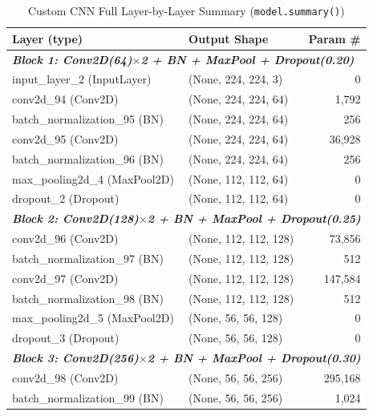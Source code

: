 \documentclass[12pt,a4paper]{article}
\begin{document}
\begin{table}[H]
\centering
\caption{Custom CNN Full Layer-by-Layer Summary (\texttt{model.summary()})}
\label{tab:summary_customcnn}
\begin{tabular}{l l r}
  \toprule
  \textbf{Layer (type)} & \textbf{Output Shape} & \textbf{Param \#} \\
  \midrule
  \multicolumn{3}{l}{\textit{\textbf{Block 1: Conv2D(64)$\times$2 + BN + MaxPool + Dropout(0.20)}}} \\
  input\_layer\_2 (InputLayer)          & (None, 224, 224, 3)   &           0 \\
  conv2d\_94 (Conv2D)                   & (None, 224, 224, 64)  &       1,792 \\
  batch\_normalization\_95 (BN)         & (None, 224, 224, 64)  &         256 \\
  conv2d\_95 (Conv2D)                   & (None, 224, 224, 64)  &      36,928 \\
  batch\_normalization\_96 (BN)         & (None, 224, 224, 64)  &         256 \\
  max\_pooling2d\_4 (MaxPool2D)         & (None, 112, 112, 64)  &           0 \\
  dropout\_2 (Dropout)                  & (None, 112, 112, 64)  &           0 \\
  \midrule
  \multicolumn{3}{l}{\textit{\textbf{Block 2: Conv2D(128)$\times$2 + BN + MaxPool + Dropout(0.25)}}} \\
  conv2d\_96 (Conv2D)                   & (None, 112, 112, 128) &      73,856 \\
  batch\_normalization\_97 (BN)         & (None, 112, 112, 128) &         512 \\
  conv2d\_97 (Conv2D)                   & (None, 112, 112, 128) &     147,584 \\
  batch\_normalization\_98 (BN)         & (None, 112, 112, 128) &         512 \\
  max\_pooling2d\_5 (MaxPool2D)         & (None, 56, 56, 128)   &           0 \\
  dropout\_3 (Dropout)                  & (None, 56, 56, 128)   &           0 \\
  \midrule
  \multicolumn{3}{l}{\textit{\textbf{Block 3: Conv2D(256)$\times$2 + BN + MaxPool + Dropout(0.30)}}} \\
  conv2d\_98 (Conv2D)                   & (None, 56, 56, 256)   &     295,168 \\
  batch\_normalization\_99 (BN)         & (None, 56, 56, 256)   &       1,024 \\

\end{tabular}
\end{table}
\end{document}
